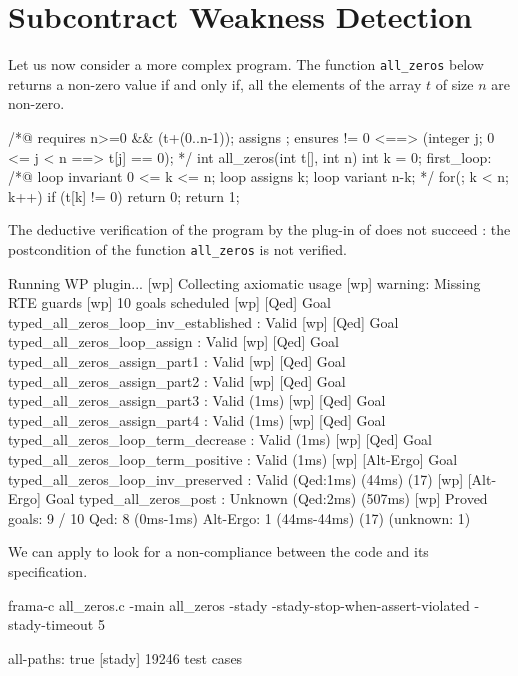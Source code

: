 \documentclass[web]{frama-c-book}
\begin{document}
\section{Subcontract Weakness Detection}

Let us now consider a more complex program. The function \lstinline'all_zeros' below returns a non-zero value if and only if, all the elements of the array $t$ of size $n$ are non-zero.

\begin{ccode}
/*@ requires n>=0 && \valid(t+(0..n-1));
    assigns \nothing;
    ensures \result != 0 <==> 
      (\forall integer j; 0 <= j < n ==> t[j] == 0);
*/
int all_zeros(int t[], int n) {
  int k = 0;
 first_loop:
  /*@ loop invariant 0 <= k <= n;
      loop assigns k;
      loop variant n-k; 
  */
  for(; k < n; k++) 
    if (t[k] != 0) 
      return 0;
  return 1;
}
\end{ccode}

The deductive verification of the program by the  plug-in of \framac does not succeed : the postcondition of the function \lstinline'all_zeros' is not verified.

\begin{shell}
[wp] Running WP plugin...
[wp] Collecting axiomatic usage
[wp] warning: Missing RTE guards
[wp] 10 goals scheduled
[wp] [Qed] Goal typed_all_zeros_loop_inv_established : Valid
[wp] [Qed] Goal typed_all_zeros_loop_assign : Valid
[wp] [Qed] Goal typed_all_zeros_assign_part1 : Valid
[wp] [Qed] Goal typed_all_zeros_assign_part2 : Valid
[wp] [Qed] Goal typed_all_zeros_assign_part3 : Valid (1ms)
[wp] [Qed] Goal typed_all_zeros_assign_part4 : Valid (1ms)
[wp] [Qed] Goal typed_all_zeros_loop_term_decrease : Valid (1ms)
[wp] [Qed] Goal typed_all_zeros_loop_term_positive : Valid (1ms)
[wp] [Alt-Ergo] Goal typed_all_zeros_loop_inv_preserved : Valid (Qed:1ms) (44ms) (17)
[wp] [Alt-Ergo] Goal typed_all_zeros_post : Unknown (Qed:2ms) (507ms)
[wp] Proved goals:    9 / 10
     Qed:             8  (0ms-1ms)
     Alt-Ergo:        1  (44ms-44ms) (17) (unknown: 1)
\end{shell}

We can apply \stady to look for a non-compliance between the code and its specification.

\begin{shell}
  frama-c all_zeros.c -main all_zeros -stady -stady-stop-when-assert-violated
  -stady-timeout 5
\end{shell}

\begin{shell}
[stady] all-paths: true
[stady] 19246 test cases
\end{shell}
\end{document}

